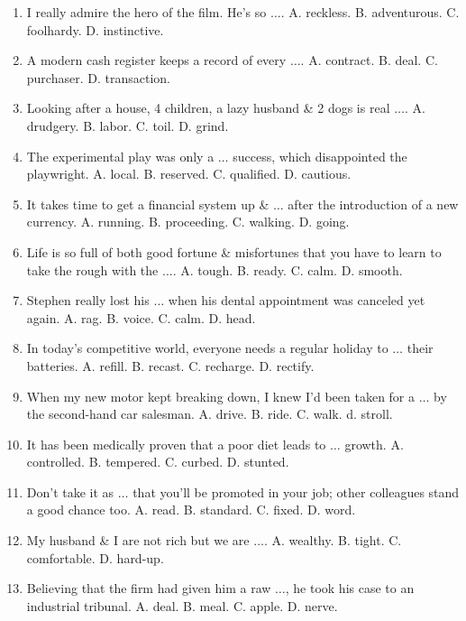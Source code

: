 \documentclass{article}
\numberwithin{equation}{section}
\begin{document}
\begin{enumerate}[leftmargin=2mm]
	\item I really admire the hero of the film. He's so $\ldots$. {\sf A.} reckless. {\sf B.} adventurous. {\sf C.} foolhardy. {\sf D.} instinctive.
	\item A modern cash register keeps a record of every $\ldots$. {\sf A.} contract. {\sf B.} deal. {\sf C.} purchaser. {\sf D.} transaction.
	\item Looking after a house, 4 children, a lazy husband \& 2 dogs is real $\ldots$. {\sf A.} drudgery. {\sf B.} labor. {\sf C.} toil. {\sf D.} grind.
	\item The experimental play was only a $\ldots$ success, which disappointed the playwright. {\sf A.} local. {\sf B.} reserved. {\sf C.} qualified. {\sf D.} cautious.
	\item It takes time to get a financial system up \& $\ldots$ after the introduction of a new currency. {\sf A.} running. {\sf B.} proceeding. {\sf C.} walking. {\sf D.} going.
	\item Life is so full of both good fortune \& misfortunes that you have to learn to take the rough with the $\ldots$. {\sf A.} tough. {\sf B.} ready. {\sf C.} calm. {\sf D.} smooth.
	\item Stephen really lost his $\ldots$ when his dental appointment was canceled yet again. {\sf A.} rag. {\sf B.} voice. {\sf C.} calm. {\sf D.} head.
	\item In today's competitive world, everyone needs a regular holiday to $\ldots$ their batteries. {\sf A.} refill. {\sf B.} recast. {\sf C.} recharge. {\sf D.} rectify.
	\item When my new motor kept breaking down, I knew I'd been taken for a $\ldots$ by the second-hand car salesman. {\sf A.} drive. {\sf B.} ride. {\sf C.} walk. d. stroll.
	\item It has been medically proven that a poor diet leads to $\ldots$ growth. {\sf A.} controlled. {\sf B.} tempered. {\sf C.} curbed. {\sf D.} stunted.
	\item Don't take it as $\ldots$ that you'll be promoted in your job; other colleagues stand a good chance too. {\sf A.} read. {\sf B.} standard. {\sf C.} fixed. {\sf D.} word.
	\item My husband \& I are not rich but we are $\ldots$. {\sf A.} wealthy. {\sf B.} tight. {\sf C.} comfortable. {\sf D.} hard-up.
	\item Believing that the firm had given him a raw $\ldots$, he took his case to an industrial tribunal. {\sf A.} deal. {\sf B.} meal. {\sf C.} apple. {\sf D.} nerve.

\end{enumerate}
\end{document}
